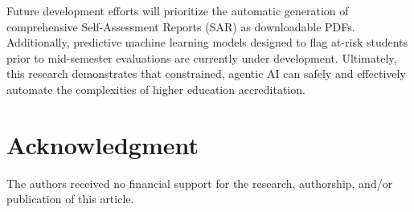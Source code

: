 \documentclass[conference]{IEEEtran}
\begin{document}
Future development efforts will prioritize the automatic generation of comprehensive Self-Assessment Reports (SAR) as downloadable PDFs. Additionally, predictive machine learning models designed to flag at-risk students prior to mid-semester evaluations are currently under development. Ultimately, this research demonstrates that constrained, agentic AI can safely and effectively automate the complexities of higher education accreditation.

\section*{Acknowledgment}
The authors received no financial support for the research, authorship, and/or publication of this article.
\end{document}
